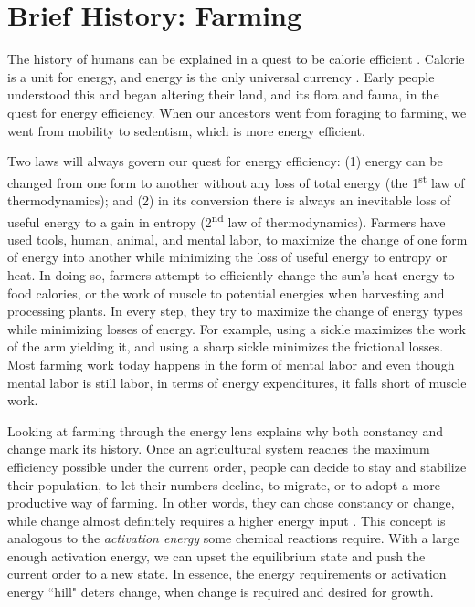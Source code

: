 \chapter{Brief History: Farming} \label{g:history}
The history of humans can be explained in a quest to be calorie efficient \cite{stephenfry2018}. Calorie is a unit for energy, and energy is the only universal currency \cite{energy2017VaclavSmil}. Early people understood this and began altering their land, and its flora and fauna, in the quest for energy efficiency. When our ancestors went from foraging to farming, we went from mobility to sedentism, which is more energy efficient. 

Two laws will always govern our quest for energy efficiency: (1) energy can be changed from one form to another without any loss of total energy (the 1\textsuperscript{st} law of thermodynamics); and (2) in its conversion there is always an inevitable loss of useful energy to a gain in entropy (2\textsuperscript{nd} law of thermodynamics). Farmers have used tools, human, animal, and mental labor, to maximize the change of one form of energy into another while minimizing the loss of useful energy to entropy or heat. In doing so, farmers attempt to efficiently change the sun's heat energy to food calories, or the work of muscle to potential energies when harvesting and processing plants. In every step, they try to maximize the change of energy types while minimizing losses of energy. For example, using a sickle maximizes the work of the arm yielding it, and using a sharp sickle minimizes the frictional losses. Most farming work today happens in the form of mental labor and even though mental labor is still labor, in terms of energy expenditures, it falls short of muscle work.

Looking at farming through the energy lens explains why both constancy and change mark its history. Once an agricultural system reaches the maximum efficiency possible under the current order, people can decide to stay and stabilize their population, to let their numbers decline, to migrate, or to adopt a more productive way of farming. In other words, they can chose constancy or change, while change almost definitely requires a higher energy input \cite{energy2017VaclavSmil}. This concept is analogous to the \textit{activation energy} some chemical reactions require. With a large enough activation energy, we can upset the equilibrium state and push the current order to a new state. In essence, the energy requirements or activation energy ``hill" deters change, when change is required and desired for growth. 
 
